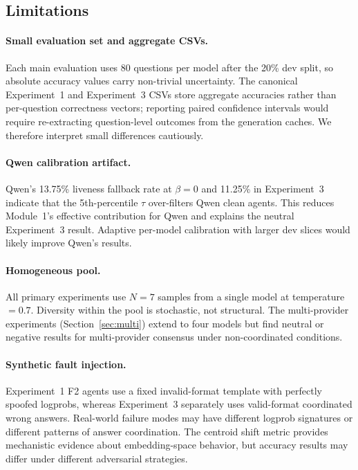 \documentclass[11pt]{article}
\begin{document}
\subsection{Limitations}
\label{sec:limitations}

\paragraph{Small evaluation set and aggregate CSVs.}
Each main evaluation uses 80 questions per model after the 20\% dev split, so
absolute accuracy values carry non-trivial uncertainty. The canonical Experiment~1
and Experiment~3 CSVs store aggregate accuracies rather than per-question
correctness vectors; reporting paired confidence intervals would require
re-extracting question-level outcomes from the generation caches. We therefore
interpret small differences cautiously.

\paragraph{Qwen calibration artifact.}
Qwen's 13.75\% liveness fallback rate at $\beta=0$ and 11.25\% in Experiment~3
indicate that the 5th-percentile $\tau$ over-filters Qwen clean agents. This
reduces Module~1's effective contribution for Qwen and explains the neutral
Experiment~3 result. Adaptive per-model calibration with larger dev slices would
likely improve Qwen's results.

\paragraph{Homogeneous pool.}
All primary experiments use $N=7$ samples from a single model at
temperature$=0.7$. Diversity within the pool is stochastic, not structural. The
multi-provider experiments (Section~\ref{sec:multi}) extend to four models but
find neutral or negative results for multi-provider consensus under
non-coordinated conditions.

\paragraph{Synthetic fault injection.}
Experiment~1 F2 agents use a fixed invalid-format template with perfectly
spoofed logprobs, whereas Experiment~3 separately uses valid-format coordinated
wrong answers. Real-world failure modes may have different logprob signatures or
different patterns of answer coordination. The centroid shift metric provides
mechanistic evidence about embedding-space behavior, but accuracy results may
differ under different adversarial strategies.
\end{document}
